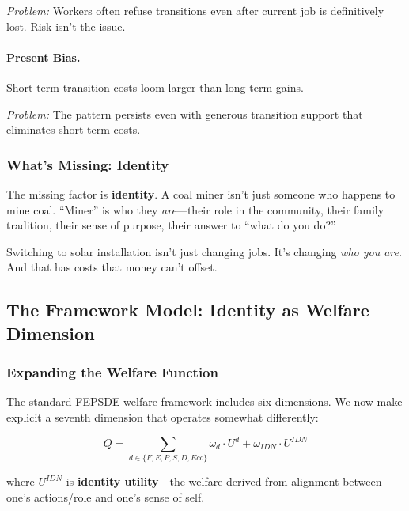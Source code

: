 \textit{Problem:} Workers often refuse transitions even after current 
job is definitively lost. Risk isn't the issue.

\paragraph{Present Bias.}
Short-term transition costs loom larger than long-term gains.

\textit{Problem:} The pattern persists even with generous transition 
support that eliminates short-term costs.

\subsubsection{What's Missing: Identity}

The missing factor is \textbf{identity}. A coal miner isn't just someone 
who happens to mine coal. ``Miner'' is who they \emph{are}---their role in 
the community, their family tradition, their sense of purpose, their answer 
to ``what do you do?''

Switching to solar installation isn't just changing jobs. It's changing 
\emph{who you are}. And that has costs that money can't offset.

\subsection{The Framework Model: Identity as Welfare Dimension}

\subsubsection{Expanding the Welfare Function}

The standard FEPSDE welfare framework includes six dimensions. We now 
make explicit a seventh dimension that operates somewhat differently:

\begin{equation}
Q = \sum_{d \in \{F, E, P, S, D, Eco\}} \omega_d \cdot U^d + \omega_{IDN} \cdot U^{IDN}
\label{eq:welfare-identity}
\end{equation}

where $U^{IDN}$ is \textbf{identity utility}---the welfare derived from 
alignment between one's actions/role and one's sense of self.

